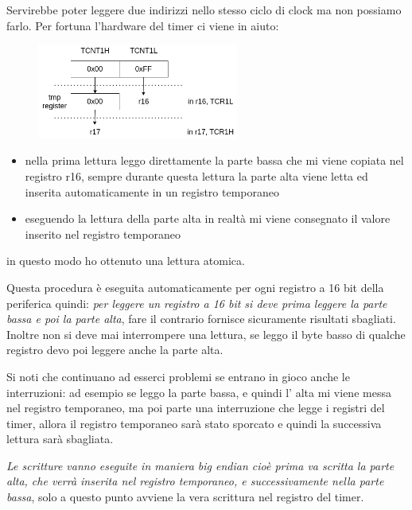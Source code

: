 Servirebbe poter leggere due indirizzi nello stesso ciclo di clock ma non possiamo farlo.
Per fortuna l'hardware del timer ci viene in aiuto:
\begin{figure}[H]
    \centering
    \includegraphics[width=250px]{images/18_Timer/atomic_read.png}
\end{figure}
\begin{itemize}
    \item nella prima lettura leggo direttamente la parte bassa che mi viene copiata nel registro r16, sempre durante questa lettura la parte alta viene letta ed inserita automaticamente in un registro temporaneo
    \item eseguendo la lettura della parte alta in realtà mi viene consegnato il valore inserito nel registro temporaneo
\end{itemize}
in questo modo ho ottenuto una lettura atomica.

Questa procedura è eseguita automaticamente per ogni registro a 16 bit della periferica quindi: \emph{per leggere un registro a 16 bit si deve prima leggere la parte bassa e poi la parte alta}, fare il contrario fornisce sicuramente risultati sbagliati.
Inoltre non si deve mai interrompere una lettura, se leggo il byte basso di qualche registro devo poi leggere anche la parte alta.

Si noti che continuano ad esserci problemi se entrano in gioco anche le interruzioni: ad esempio se leggo la parte bassa, e quindi l' alta mi viene messa nel registro temporaneo, ma poi parte una interruzione che legge i registri del timer, allora il registro temporaneo sarà stato sporcato e quindi la successiva lettura sarà sbagliata.

\emph{Le scritture vanno eseguite in maniera big endian cioè prima va scritta la parte alta, che verrà inserita nel registro temporaneo, e successivamente nella parte bassa}, solo a questo punto avviene la vera scrittura nel registro del timer.


